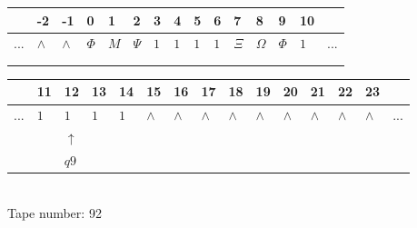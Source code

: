 \documentclass[11pt]{article}
\begin{document}
\begin{table}[H]
\centering
\begin{tabular}{lllllllllllllll}
 & -2 & -1 & 0 & 1 & 2 & 3 & 4 & 5 & 6 & 7 & 8 & 9 & 10 & \\
\hline
$...$ & \multicolumn{1}{|l|}{$\wedge$} & \multicolumn{1}{|l|}{$\wedge$} & \multicolumn{1}{|l|}{$\Phi$} & \multicolumn{1}{|l|}{$M$} & \multicolumn{1}{|l|}{$\Psi$} & \multicolumn{1}{|l|}{$1$} & \multicolumn{1}{|l|}{$1$} & \multicolumn{1}{|l|}{$1$} & \multicolumn{1}{|l|}{$1$} & \multicolumn{1}{|l|}{$\Xi$} & \multicolumn{1}{|l|}{$\Omega$} & \multicolumn{1}{|l|}{$\Phi$} & \multicolumn{1}{|l|}{$1$} & $...$\\
\hline
&  &  &  &  &  &  &  &  &  &  &  &  &  &  \\
&  &  &  &  &  &  &  &  &  &  &  &  &  &  \\
\end{tabular}
\begin{tabular}{lllllllllllllll}
 & 11 & 12 & 13 & 14 & 15 & 16 & 17 & 18 & 19 & 20 & 21 & 22 & 23 & \\
\hline
$...$ & \multicolumn{1}{|l|}{$1$} & \multicolumn{1}{|l|}{$1$} & \multicolumn{1}{|l|}{$1$} & \multicolumn{1}{|l|}{$1$} & \multicolumn{1}{|l|}{$\wedge$} & \multicolumn{1}{|l|}{$\wedge$} & \multicolumn{1}{|l|}{$\wedge$} & \multicolumn{1}{|l|}{$\wedge$} & \multicolumn{1}{|l|}{$\wedge$} & \multicolumn{1}{|l|}{$\wedge$} & \multicolumn{1}{|l|}{$\wedge$} & \multicolumn{1}{|l|}{$\wedge$} & \multicolumn{1}{|l|}{$\wedge$} & $...$\\
\hline
&  & $\uparrow$ &  &  &  &  &  &  &  &  &  &  &  &  \\
&  & $ q9 $ &  &  &  &  &  &  &  &  &  &  &  &  \\
\end{tabular}
\\
Tape number: 92
\noindent\makebox[\linewidth]{\hdashrule{\textwidth}{1pt}{1pt}}\end{table}
\end{document}
